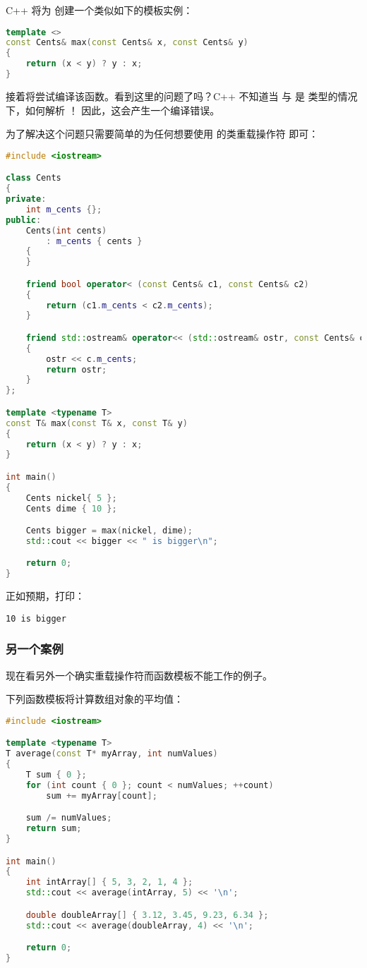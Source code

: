 \documentclass[../../LearnCpp.tex]{subfiles}
\begin{document}
C++ 将为  创建一个类似如下的模板实例：

\begin{lstlisting}[language=C++]
template <>
const Cents& max(const Cents& x, const Cents& y)
{
    return (x < y) ? y : x;
}
\end{lstlisting}

接着将尝试编译该函数。看到这里的问题了吗？C++ 不知道当  与  是  类型的情况下，如何解析 ！
因此，这会产生一个编译错误。

为了解决这个问题只需要简单的为任何想要使用  的类重载操作符  即可：

\begin{lstlisting}[language=C++]
#include <iostream>

class Cents
{
private:
    int m_cents {};
public:
    Cents(int cents)
        : m_cents { cents }
    {
    }

    friend bool operator< (const Cents& c1, const Cents& c2)
    {
        return (c1.m_cents < c2.m_cents);
    }

    friend std::ostream& operator<< (std::ostream& ostr, const Cents& c)
    {
        ostr << c.m_cents;
        return ostr;
    }
};

template <typename T>
const T& max(const T& x, const T& y)
{
    return (x < y) ? y : x;
}

int main()
{
    Cents nickel{ 5 };
    Cents dime { 10 };

    Cents bigger = max(nickel, dime);
    std::cout << bigger << " is bigger\n";

    return 0;
}
\end{lstlisting}

正如预期，打印：

\begin{lstlisting}
10 is bigger
\end{lstlisting}

\subsubsection*{另一个案例}

现在看另外一个确实重载操作符而函数模板不能工作的例子。

下列函数模板将计算数组对象的平均值：

\begin{lstlisting}[language=C++]
#include <iostream>

template <typename T>
T average(const T* myArray, int numValues)
{
    T sum { 0 };
    for (int count { 0 }; count < numValues; ++count)
        sum += myArray[count];

    sum /= numValues;
    return sum;
}

int main()
{
    int intArray[] { 5, 3, 2, 1, 4 };
    std::cout << average(intArray, 5) << '\n';

    double doubleArray[] { 3.12, 3.45, 9.23, 6.34 };
    std::cout << average(doubleArray, 4) << '\n';

    return 0;
}
\end{lstlisting}
\end{document}
